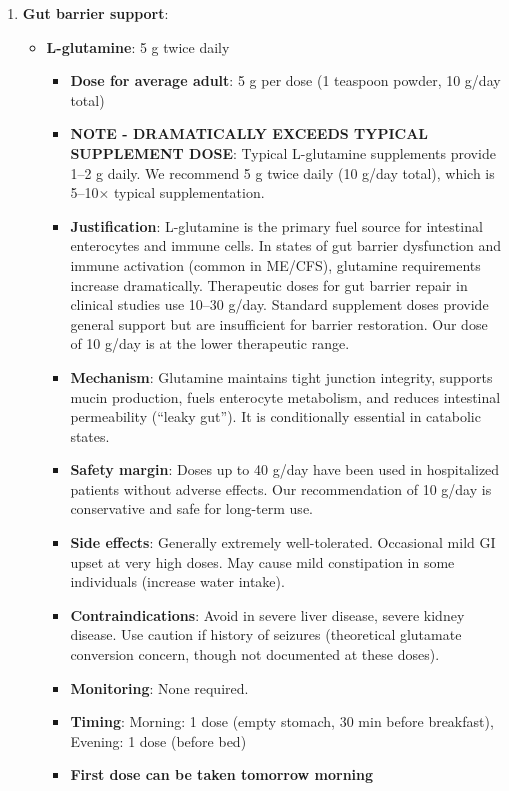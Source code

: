 \begin{enumerate}
    \item \textbf{Gut barrier support}:
    \begin{itemize}
        \item \textbf{L-glutamine}: 5 g twice daily
        \begin{itemize}
            \item \textbf{Dose for average adult}: 5 g per dose (1 teaspoon powder, 10 g/day total)
            \item \textbf{NOTE - DRAMATICALLY EXCEEDS TYPICAL SUPPLEMENT DOSE}: Typical L-glutamine supplements provide 1--2 g daily. We recommend 5 g twice daily (10 g/day total), which is 5--10$\times$ typical supplementation.
            \item \textbf{Justification}: L-glutamine is the primary fuel source for intestinal enterocytes and immune cells. In states of gut barrier dysfunction and immune activation (common in ME/CFS), glutamine requirements increase dramatically. Therapeutic doses for gut barrier repair in clinical studies use 10--30 g/day. Standard supplement doses provide general support but are insufficient for barrier restoration. Our dose of 10 g/day is at the lower therapeutic range.
            \item \textbf{Mechanism}: Glutamine maintains tight junction integrity, supports mucin production, fuels enterocyte metabolism, and reduces intestinal permeability (``leaky gut''). It is conditionally essential in catabolic states.
            \item \textbf{Safety margin}: Doses up to 40 g/day have been used in hospitalized patients without adverse effects. Our recommendation of 10 g/day is conservative and safe for long-term use.
            \item \textbf{Side effects}: Generally extremely well-tolerated. Occasional mild GI upset at very high doses. May cause mild constipation in some individuals (increase water intake).
            \item \textbf{Contraindications}: Avoid in severe liver disease, severe kidney disease. Use caution if history of seizures (theoretical glutamate conversion concern, though not documented at these doses).
            \item \textbf{Monitoring}: None required.
            \item \textbf{Timing}: Morning: 1 dose (empty stomach, 30 min before breakfast), Evening: 1 dose (before bed)
            \item \textbf{First dose can be taken tomorrow morning}
        \end{itemize}


\end{itemize}
\end{enumerate}
